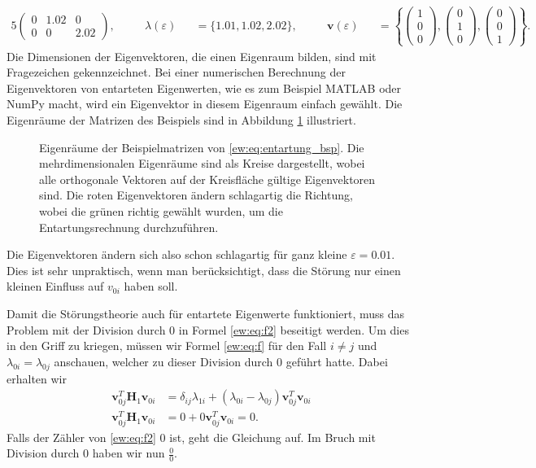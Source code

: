 \begin{alignat}{5}
\begin{pmatrix}
        0 & 1.02 & 0\\
        0 & 0 & 2.02
    \end{pmatrix},
    \quad
    && \lambda(\varepsilon) &&= \{1.01, 1.02, 2.02\},
    \quad
    && \bm v(\varepsilon) &&= \left\{
    \begin{pmatrix}
        1\\
        0\\
        0
    \end{pmatrix},
    \begin{pmatrix}
        0\\
        1\\
        0
    \end{pmatrix},
    \begin{pmatrix}
        0\\
        0\\
        1
    \end{pmatrix}
    \right\}. \label{ew:eq:entartung_bsp}
\end{alignat}
Die Dimensionen der Eigenvektoren, die einen Eigenraum bilden, sind mit Fragezeichen gekennzeichnet.
Bei einer numerischen Berechnung der Eigenvektoren von entarteten Eigenwerten, wie es zum Beispiel MATLAB oder NumPy macht, wird ein Eigenvektor in diesem Eigenraum einfach gewählt.
Die Eigenräume der Matrizen des Beispiels sind in Abbildung \ref{ew:fig:entartung} illustriert.
\begin{figure}
    \begin{center}
        
    \end{center}
    \caption{
        Eigenräume der Beispielmatrizen von \eqref{ew:eq:entartung_bsp}.
        Die mehrdimensionalen Eigenräume sind als Kreise dargestellt, wobei alle orthogonale Vektoren auf der Kreisfläche gültige Eigenvektoren sind.
        Die roten Eigenvektoren ändern schlagartig die Richtung, wobei die grünen richtig gewählt wurden, um die Entartungsrechnung durchzuführen.
        }
    \label{ew:fig:entartung}
\end{figure}
Die Eigenvektoren ändern sich also schon schlagartig für ganz kleine $\varepsilon = 0.01$.
Dies ist sehr unpraktisch, wenn man berücksichtigt, dass die Störung nur einen kleinen Einfluss auf $v_{0i}$ haben soll.

Damit die Störungstheorie auch für entartete Eigenwerte funktioniert, muss das Problem mit der Division durch $0$ in Formel \eqref{ew:eq:f2} beseitigt werden.
Um dies in den Griff zu kriegen, müssen wir Formel \eqref{ew:eq:f} für den Fall $i \neq j$ und $\lambda_{0i} = \lambda_{0j}$ anschauen, welcher zu dieser Division durch $0$ geführt hatte.
Dabei erhalten wir
\begin{align}
    \bm v_{0j}^T \bm H_1 \bm v_{0i}
    &=
    \delta_{ij} \lambda_{1i} +
    ( \lambda_{0i} - \lambda_{0j} )
    \bm v_{0j}^T  \bm v_{0i} \nonumber
    \\
    \bm v_{0j}^T \bm H_1 \bm v_{0i}
    &=
    0 +
    0
    \bm v_{0j}^T  \bm v_{0i}
    = 0.
\end{align}
Falls der Zähler von \eqref{ew:eq:f2} $0$ ist, geht die Gleichung auf.
Im Bruch mit Division durch $0$ haben wir nun $\frac{0}{0}$.

